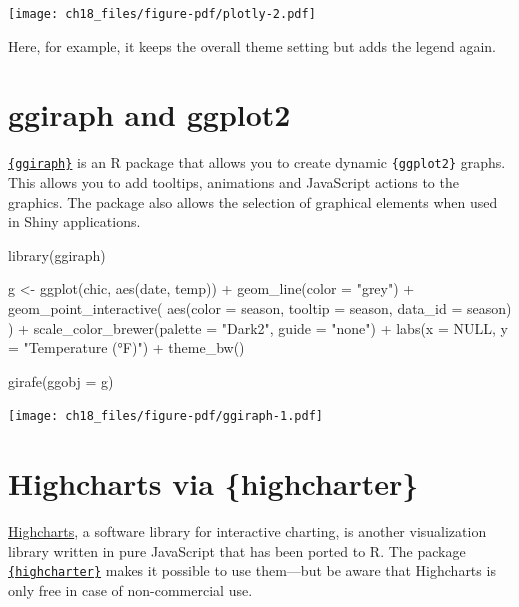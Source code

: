 \documentclass[
  letterpaper,
  DIV=11,
  numbers=noendperiod]{scrreprt}
\newenvironment{Shaded}{\begin{snugshade}}{\end{snugshade}}
\newcommand{\AttributeTok}[1]{\textcolor[rgb]{0.40,0.45,0.13}{#1}}
\newcommand{\ConstantTok}[1]{\textcolor[rgb]{0.56,0.35,0.01}{#1}}
\newcommand{\FunctionTok}[1]{\textcolor[rgb]{0.28,0.35,0.67}{#1}}
\newcommand{\NormalTok}[1]{\textcolor[rgb]{0.00,0.23,0.31}{#1}}
\newcommand{\OtherTok}[1]{\textcolor[rgb]{0.00,0.23,0.31}{#1}}
\newcommand{\SpecialCharTok}[1]{\textcolor[rgb]{0.37,0.37,0.37}{#1}}
\newcommand{\StringTok}[1]{\textcolor[rgb]{0.13,0.47,0.30}{#1}}
\begin{document}
\texttt{[image: ch18\_files/figure-pdf/plotly-2.pdf]}

Here, for example, it keeps the overall theme setting but adds the
legend again.

\section{ggiraph and ggplot2}\label{ggiraph-and-ggplot2}

\href{https://davidgohel.github.io/ggiraph/index.html}{\texttt{\{ggiraph\}}}
is an R package that allows you to create dynamic \texttt{\{ggplot2\}}
graphs. This allows you to add tooltips, animations and JavaScript
actions to the graphics. The package also allows the selection of
graphical elements when used in Shiny applications.

\begin{Shaded}
\begin{Highlighting}[]
\FunctionTok{library}\NormalTok{(ggiraph)}

\NormalTok{g }\OtherTok{\textless{}{-}} \FunctionTok{ggplot}\NormalTok{(chic, }\FunctionTok{aes}\NormalTok{(date, temp)) }\SpecialCharTok{+}
  \FunctionTok{geom\_line}\NormalTok{(}\AttributeTok{color =} \StringTok{"grey"}\NormalTok{) }\SpecialCharTok{+}
  \FunctionTok{geom\_point\_interactive}\NormalTok{(}
    \FunctionTok{aes}\NormalTok{(}\AttributeTok{color =}\NormalTok{ season, }\AttributeTok{tooltip =}\NormalTok{ season, }\AttributeTok{data\_id =}\NormalTok{ season)}
\NormalTok{  ) }\SpecialCharTok{+}
  \FunctionTok{scale\_color\_brewer}\NormalTok{(}\AttributeTok{palette =} \StringTok{"Dark2"}\NormalTok{, }\AttributeTok{guide =} \StringTok{"none"}\NormalTok{) }\SpecialCharTok{+}
  \FunctionTok{labs}\NormalTok{(}\AttributeTok{x =} \ConstantTok{NULL}\NormalTok{, }\AttributeTok{y =} \StringTok{"Temperature (°F)"}\NormalTok{) }\SpecialCharTok{+}
  \FunctionTok{theme\_bw}\NormalTok{()}

\FunctionTok{girafe}\NormalTok{(}\AttributeTok{ggobj =}\NormalTok{ g)}
\end{Highlighting}
\end{Shaded}

\texttt{[image: ch18\_files/figure-pdf/ggiraph-1.pdf]}

\section{Highcharts via
\{highcharter\}}\label{highcharts-via-highcharter}

\href{https://www.highcharts.com/}{Highcharts}, a software library for
interactive charting, is another visualization library written in pure
JavaScript that has been ported to R. The package
\href{https://jkunst.com/highcharter/}{\texttt{\{highcharter\}}} makes
it possible to use them---but be aware that Highcharts is only free in
case of non-commercial use.
\end{document}
